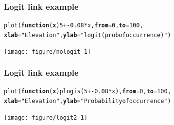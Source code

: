 \documentclass[color=usenames,dvipsnames]{beamer}\usepackage[]{graphicx}\usepackage[]{xcolor}
\makeatletter
\newcommand{\hlnum}[1]{\textcolor[rgb]{0.69,0.494,0}{#1}}%
\newcommand{\hlsng}[1]{\textcolor[rgb]{0.749,0.012,0.012}{#1}}%
\newcommand{\hlopt}[1]{\textcolor[rgb]{0,0,0}{#1}}%
\newcommand{\hldef}[1]{\textcolor[rgb]{0,0,0}{#1}}%
\newcommand{\hlkwa}[1]{\textcolor[rgb]{0,0,0}{\textbf{#1}}}%
\newcommand{\hlkwc}[1]{\textcolor[rgb]{0,0,0}{\textbf{#1}}}%
\newcommand{\hlkwd}[1]{\textcolor[rgb]{0.004,0.004,0.506}{#1}}%
\newenvironment{kframe}{%
 \def\at@end@of@kframe{}%
 \ifinner\ifhmode%
  \def\at@end@of@kframe{\end{minipage}}%
  \begin{minipage}{\columnwidth}%
 \fi\fi%
 \def\FrameCommand##1{\hskip\@totalleftmargin \hskip-\fboxsep
 \colorbox{shadecolor}{##1}\hskip-\fboxsep
     \hskip-\linewidth \hskip-\@totalleftmargin \hskip\columnwidth}%
 \MakeFramed {\advance\hsize-\width
   \@totalleftmargin\z@ \linewidth\hsize
   \@setminipage}}%
 {\par\unskip\endMakeFramed%
 \at@end@of@kframe}
\newenvironment{knitrout}{}{} %
\makeatother
\begin{document}



\begin{frame}[fragile]
  \frametitle{Logit link example}
\begin{knitrout}\scriptsize
{}\color{fgcolor}\begin{kframe}
\begin{alltt}
\hlkwd{plot}\hldef{(}\hlkwa{function}\hldef{(}\hlkwc{x}\hldef{)} \hlnum{5} \hlopt{+ -}\hlnum{0.08}\hlopt{*}\hldef{x,} \hlkwc{from}\hldef{=}\hlnum{0}\hldef{,} \hlkwc{to}\hldef{=}\hlnum{100}\hldef{,}
     \hlkwc{xlab}\hldef{=}\hlsng{"Elevation"}\hldef{,} \hlkwc{ylab}\hldef{=}\hlsng{"logit(prob of occurrence)"}\hldef{)}
\end{alltt}
\end{kframe}
\end{knitrout}
\centering
  \texttt{[image: figure/nologit-1]} \\
\end{frame}




\begin{frame}[fragile]
  \frametitle{Logit link example}
\begin{knitrout}\scriptsize
{}\color{fgcolor}\begin{kframe}
\begin{alltt}
\hlkwd{plot}\hldef{(}\hlkwa{function}\hldef{(}\hlkwc{x}\hldef{)} \hlkwd{plogis}\hldef{(}\hlnum{5} \hlopt{+ -}\hlnum{0.08}\hlopt{*}\hldef{x),} \hlkwc{from}\hldef{=}\hlnum{0}\hldef{,} \hlkwc{to}\hldef{=}\hlnum{100}\hldef{,}
     \hlkwc{xlab}\hldef{=}\hlsng{"Elevation"}\hldef{,} \hlkwc{ylab}\hldef{=}\hlsng{"Probability of occurrence"}\hldef{)}
\end{alltt}
\end{kframe}
\end{knitrout}
\centering
  \texttt{[image: figure/logit2-1]} \\
\end{frame}
\end{document}
